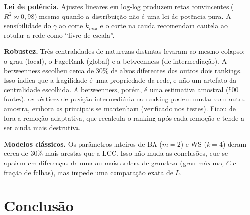 \documentclass[sigconf]{webmedia}
\begin{document}
\textbf{Lei de potência.} Ajustes lineares em log-log produzem retas convincentes
($R^2\approx0{,}98$) mesmo quando a distribuição não é uma lei de potência pura. A
sensibilidade do $\gamma$ ao corte $k_{min}$ e o corte na cauda recomendam cautela ao
rotular a rede como ``livre de escala''.

\textbf{Robustez.} Três centralidades de naturezas distintas levaram ao mesmo colapso:
o grau (local), o PageRank (global) e a betweenness (de intermediação). A betweenness
escolheu cerca de 30\% de alvos diferentes dos outros dois rankings. Isso indica que a
fragilidade é uma propriedade da rede, e não um artefato da centralidade escolhida. A
betweenness, porém, é uma estimativa amostral (500 fontes): os vértices de posição
intermediária no ranking podem mudar com outra amostra, embora os principais se mantenham
(verificado nos testes). Ficou de fora a remoção adaptativa, que recalcula o ranking após
cada remoção e tende a ser ainda mais destrutiva.

\textbf{Modelos clássicos.} Os parâmetros inteiros de BA ($m=2$) e WS ($k=4$) deram cerca
de 30\% mais arestas que a LCC. Isso não muda as conclusões, que se apoiam em diferenças
de uma ou mais ordens de grandeza (grau máximo, $C$ e fração de folhas), mas impede uma
comparação exata de $L$.

\section{Conclusão}
\label{sec:conclusao}
\end{document}

